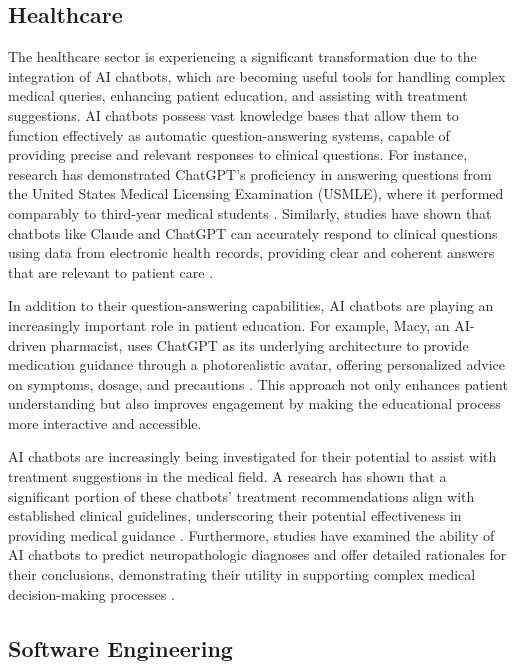 \subsection{Healthcare}

The healthcare sector is experiencing a significant transformation due to the integration of AI chatbots, which are becoming useful tools for handling complex medical queries, enhancing patient education, and assisting with treatment suggestions. AI chatbots possess vast knowledge bases that allow them to function effectively as automatic question-answering systems, capable of providing precise and relevant responses to clinical questions. For instance, research has demonstrated ChatGPT's proficiency in answering questions from the United States Medical Licensing Examination (USMLE), where it performed comparably to third-year medical students \cite{gilson2023does}. Similarly, studies have shown that chatbots like Claude and ChatGPT can accurately respond to clinical questions using data from electronic health records, providing clear and coherent answers that are relevant to patient care \cite{hamidi2023evaluation}.

In addition to their question-answering capabilities, AI chatbots are playing an increasingly important role in patient education. For example, Macy, an AI-driven pharmacist, uses ChatGPT as its underlying architecture to provide medication guidance through a photorealistic avatar, offering personalized advice on symptoms, dosage, and precautions \cite{leung2023}. This approach not only enhances patient understanding but also improves engagement by making the educational process more interactive and accessible.

AI chatbots are increasingly being investigated for their potential to assist with treatment suggestions in the medical field. A research has shown that a significant portion of these chatbots' treatment recommendations align with established clinical guidelines, underscoring their potential effectiveness in providing medical guidance \cite{chen2023use}. Furthermore, studies have examined the ability of AI chatbots to predict neuropathologic diagnoses and offer detailed rationales for their conclusions, demonstrating their utility in supporting complex medical decision-making processes \cite{koga2024evaluating}.

\subsection{Software Engineering}

